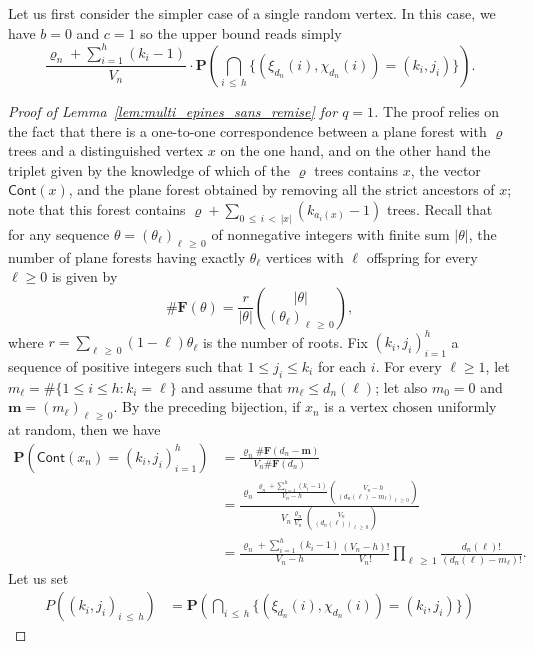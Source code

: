 \documentclass[10pt]{amsart}
\theoremstyle{definition}\newtheorem{defi}[theo]{Definition}\newtheorem{rema}[theo]{Remark}\newtheorem{exam}[theo]{Example}\newtheorem{exem}[theo]{Example}\newtheorem{nota}[theo]{Notation}
\newcommand{\ensembles}[1]{\mathbf{#1}}
\renewcommand{\P}{\ensembles{P}}
\renewcommand{\Pr}[1]{\P\left(#1\right)}
\newcommand{\1}{\ensembles{1}}
\newcommand{\m}{\mathbf{m}}
\renewcommand{\le}{\leqslant}
\renewcommand{\ge}{\geqslant}
\newcommand{\Cont}{\mathsf{Cont}}
\newcommand{\vertices}{V}
\providecommand{\?}{}
\begin{document}
Let us first consider the simpler case of a single random vertex. In this case, we have $b=0$ and $c=1$ so the upper bound reads simply
\[
\frac{\varrho_n + \sum\limits_{i=1}^h (k_i - 1)}{\vertices_n}
\cdot \Pr{\bigcap_{i\,\le\,h} \big\{\left(\xi_{d_n}(i), \chi_{d_n}(i)\right) = \left(k_i, j_i\right)\big\}}.
\]


\begin{proof}[Proof of Lemma~\ref{lem:multi_epines_sans_remise} for $q = 1$]
The proof relies on the fact that there is a one-to-one correspondence between a plane forest with $\varrho$ trees and a distinguished vertex $x$ on the one hand, and on the other hand the triplet given by the knowledge of which of the $\varrho$ trees contains $x$, the vector $\Cont(x)$, and the plane forest obtained by removing all the strict ancestors of $x$; note that this forest contains $\varrho + \sum_{0\,\le\,i\,<\,|x|} (k_{a_i(x)} - 1)$ trees. Recall that for any sequence $\theta = (\theta_\ell)_{\ell\,\ge\,0}$ of nonnegative integers with finite sum $|\theta|$, the number of plane forests having exactly $\theta_\ell$ vertices with $\ell$ offspring for every $\ell \ge 0$ is given by
\[
\# \ensembles{F}(\theta) = \frac{r}{|\theta|} \binom{|\theta|}{(\theta_\ell)_{\ell\,\ge\,0}},
\]
where $r= \sum_{\ell\,\ge\,0} (1-\ell) \theta_\ell$ is the number of roots. Fix $(k_i, j_i)_{i=1}^h$ a sequence of positive integers such that $1 \le j_i \le k_i$ for each $i$. For every $\ell \ge 1$, let $m_\ell = \#\{1 \le i \le h : k_i = \ell\}$ and assume that $m_\ell \le d_n(\ell)$; let also $m_0 = 0$ and $\m = (m_\ell)_{\ell\,\ge\,0}$. By the preceding bijection, if $x_n$ is a vertex chosen uniformly at random, then we have
\begin{align*}
\Pr{\Cont(x_n) = \left(k_i, j_i\right)_{i=1}^h} &= \frac{\varrho_n \#\ensembles{F}(d_n - \m)}{\vertices_n \#\ensembles{F}(d_n)}
\\
&= \frac{\varrho_n \frac{\varrho_n + \sum\limits_{i=1}^h (k_i - 1)}{\vertices_n-h} \binom{\vertices_n-h}{\left(d_n(\ell)-m_\ell\right)_{\ell\,\ge\,0}}}{\vertices_n \frac{\varrho_n}{\vertices_n} \binom{\vertices_n}{\left(d_n(\ell)\right)_{\ell\,\ge\, 0}}}
\\
&= \frac{\varrho_n + \sum\limits_{i=1}^h \left(k_i - 1\right)}{\vertices_n-h} \frac{\left(\vertices_n-h\right)!}{\vertices_n!} \prod_{\ell\,\ge\,1} \frac{d_n(\ell)!}{(d_n(\ell)-m_\ell)!}.
\end{align*}
Let us set
\begin{align*}
P\left(\left(k_i, j_i\right)_{i\,\le\,h}\right) &= \Pr{\bigcap_{i\,\le\,h} \big\{\left(\xi_{d_n}(i), \chi_{d_n}(i)\right) = \left(k_i, j_i\right)\big\}}

\end{align*}
\end{proof}
\end{document}
